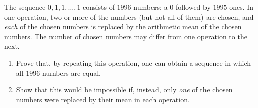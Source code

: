 The sequence $0,1,1,\dots,1$ consists of $1996$ numbers: a $0$ followed by $1995$ ones. In one operation, two or more of the numbers (but not all of them) are chosen, and \emph{each} of the chosen numbers is replaced by the arithmetic mean of the chosen numbers. The number of chosen numbers may differ from one operation to the next.
\begin{enumerate}
\item[(a)] Prove that, by repeating this operation, one can obtain a sequence in which all $1996$ numbers are equal.
\item[(b)] Show that this would be impossible if, instead, only \emph{one} of the chosen numbers were replaced by their mean in each operation.
\end{enumerate}
